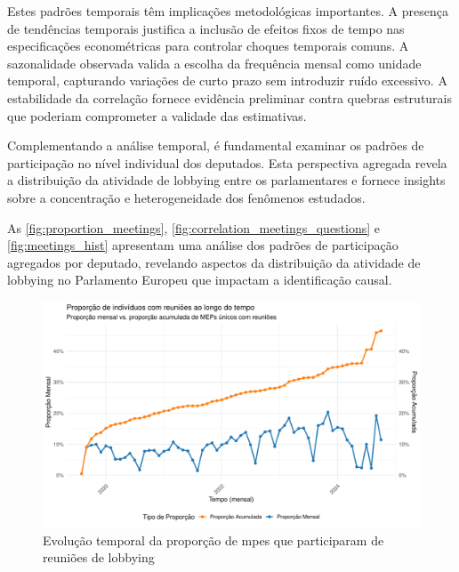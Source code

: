 Estes padrões temporais têm implicações metodológicas importantes. A presença de tendências temporais justifica a inclusão de efeitos fixos de tempo nas especificações econométricas para controlar choques temporais comuns. A sazonalidade observada valida a escolha da frequência mensal como unidade temporal, capturando variações de curto prazo sem introduzir ruído excessivo. A estabilidade da correlação fornece evidência preliminar contra quebras estruturais que poderiam comprometer a validade das estimativas.


Complementando a análise temporal, é fundamental examinar os padrões de participação no nível individual dos deputados. Esta perspectiva agregada revela a distribuição da atividade de lobbying entre os parlamentares e fornece insights sobre a concentração e heterogeneidade dos fenômenos estudados.



As \autoref{fig:proportion_meetings}, \autoref{fig:correlation_meetings_questions} e \autoref{fig:meetings_hist} apresentam uma análise dos padrões de participação agregados por deputado, revelando aspectos da distribuição da atividade de lobbying no Parlamento Europeu que impactam a identificação causal.


\begin{figure}[htbp]
    \centering
    \includegraphics[width=\textwidth]{figures/descriptive_plots/fig2_proportion_meetings.pdf}
    \caption{Evolução temporal da proporção de \acrshort{mpe}s que participaram de reuniões de lobbying}
    \label{fig:proportion_meetings}
\end{figure}

